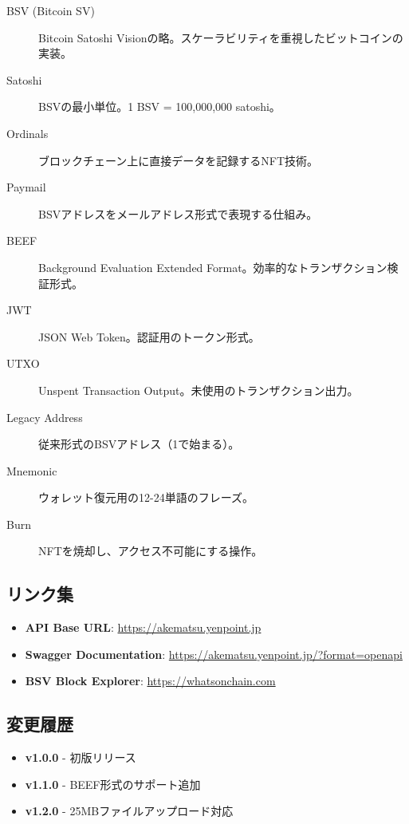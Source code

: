 \documentclass[11pt,a4paper]{ltjsarticle}  %
\begin{document}
\begin{description}
    \item[BSV (Bitcoin SV)] Bitcoin Satoshi Visionの略。スケーラビリティを重視したビットコインの実装。
    \item[Satoshi] BSVの最小単位。1 BSV = 100,000,000 satoshi。
    \item[Ordinals] ブロックチェーン上に直接データを記録するNFT技術。
    \item[Paymail] BSVアドレスをメールアドレス形式で表現する仕組み。
    \item[BEEF] Background Evaluation Extended Format。効率的なトランザクション検証形式。
    \item[JWT] JSON Web Token。認証用のトークン形式。
    \item[UTXO] Unspent Transaction Output。未使用のトランザクション出力。
    \item[Legacy Address] 従来形式のBSVアドレス（1で始まる）。
    \item[Mnemonic] ウォレット復元用の12-24単語のフレーズ。
    \item[Burn] NFTを焼却し、アクセス不可能にする操作。
\end{description}

\subsection{リンク集}

\begin{itemize}
    \item \textbf{API Base URL}: \url{https://akematsu.yenpoint.jp}
    \item \textbf{Swagger Documentation}: \url{https://akematsu.yenpoint.jp/?format=openapi}
    \item \textbf{BSV Block Explorer}: \url{https://whatsonchain.com}
\end{itemize}

\subsection{変更履歴}

\begin{itemize}
    \item \textbf{v1.0.0} - 初版リリース
    \item \textbf{v1.1.0} - BEEF形式のサポート追加
    \item \textbf{v1.2.0} - 25MBファイルアップロード対応
\end{itemize}
\end{document}
